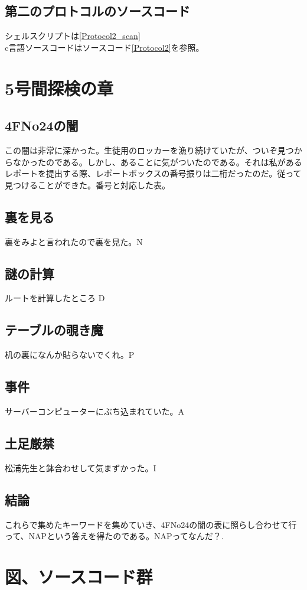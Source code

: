 \documentclass[a4paper,12pt]{jarticle}
\begin{document}
 \subsection{第二のプロトコルのソースコード}
 シェルスクリプトは\ref{Protocol2_scan} \\
 c言語ソースコードはソースコード\ref{Protocol2}を参照。
 \section{5号間探検の章}
 \subsection{4FNo24の闇}
 この闇は非常に深かった。生徒用のロッカーを漁り続けていたが、ついぞ見つからなかったのである。しかし、あることに気がついたのである。それは私があるレポートを提出する際、レポートボックスの番号振りは二桁だったのだ。従って見つけることができた。番号と対応した表。
 
 \subsection{裏を見る}
 裏をみよと言われたので裏を見た。N
 \subsection{謎の計算}
 ルートを計算したところ D
 \subsection{テーブルの覗き魔}
 机の裏になんか貼らないでくれ。P
 \subsection{事件}
 サーバーコンピューターにぶち込まれていた。A
 \subsection{土足厳禁}
 松浦先生と鉢合わせして気まずかった。I
 \subsection{結論}
 これらで集めたキーワードを集めていき、4FNo24の闇の表に照らし合わせて行って、NAPという答えを得たのである。NAPってなんだ？.
 \section{図、ソースコード群}
 
 
 
  
\end{document}
